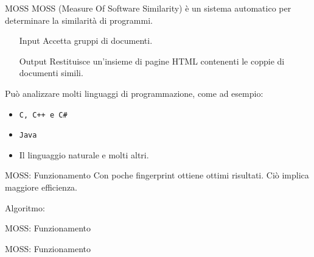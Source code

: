 \documentclass{beamer}
\begin{document}
	\begin{frame}{MOSS}
		MOSS (Measure Of Software Similarity) è un sistema automatico per determinare la similarità di programmi.
		
		\begin{itemize}
			\item[Input] Accetta gruppi di documenti.
			\item[Output] Restituisce un'insieme di pagine HTML contenenti le coppie di documenti simili.
		\end{itemize}
		
		\pause
		Può analizzare molti linguaggi di programmazione, come ad esempio:
		\begin{itemize}
			\item \texttt{C, C++ e C\#}
			\item \texttt{Java}
			\item Il linguaggio naturale e molti altri.
		\end{itemize}
	\end{frame}

	\begin{frame}{MOSS: Funzionamento}
		Con poche fingerprint ottiene ottimi risultati. Ciò implica maggiore efficienza.
		
		Algoritmo:
			\vspace{-0.3cm}\begin{center}
			\end{center}
	\end{frame}

	\begin{frame}{MOSS: Funzionamento}
		\vspace{-0.8cm}\begin{center}
		\end{center}
	\end{frame}
	
	\begin{frame}{MOSS: Funzionamento}
		\vspace{-0.5cm}\begin{center}
		\end{center}
	\end{frame}
	
\end{document}
